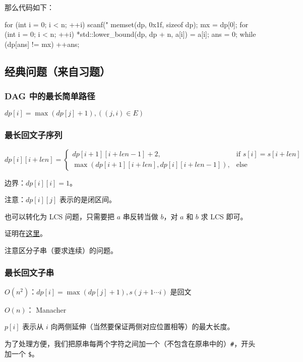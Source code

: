 那么代码如下：

\begin{cppcode}
for (int i = 0; i < n; ++i) scanf("%
memset(dp, 0x1f, sizeof dp);
mx = dp[0];
for (int i = 0; i < n; ++i) {
  *std::lower_bound(dp, dp + n, a[i]) = a[i];
}
ans = 0;
while (dp[ans] != mx) ++ans;
\end{cppcode}

\subsection{经典问题（来自习题）}

\subsubsection{DAG 中的最长简单路径}

$dp[i] = \max(dp[j] + 1), ((j, i) \in E)$

\subsubsection{最长回文子序列}

$$
dp[i][i + len] =
\begin{cases}
dp[i + 1][i + len - 1] + 2,  & \text{if $s[i] = s[i + len]$} \\[2ex]
\max(dp[i + 1][i + len], dp[i][i + len - 1]), & \text{else}
\end{cases}
$$

边界：$dp[i][i] = 1$。

注意：$dp[i][j]$ 表示的是闭区间。

也可以转化为 LCS 问题，只需要把 $a$ 串反转当做 $b$，对 $a$ 和 $b$ 求 LCS 即可。

证明在\href{https://www.zhihu.com/question/34580085/answer/59539708}{这里}。

注意区分子串（要求连续）的问题。

\subsubsection{最长回文子串}

$O(n^2)$：$dp[i] = \max(dp[j] + 1), s(j + 1 \cdots i)$ 是回文

$O(n)$： Manacher

$p[i]$ 表示从 $i$ 向两侧延伸（当然要保证两侧对应位置相等）的最大长度。

为了处理方便，我们把原串每两个字符之间加一个（不包含在原串中的）\texttt{\#}，开头加一个 \texttt{\$}。

